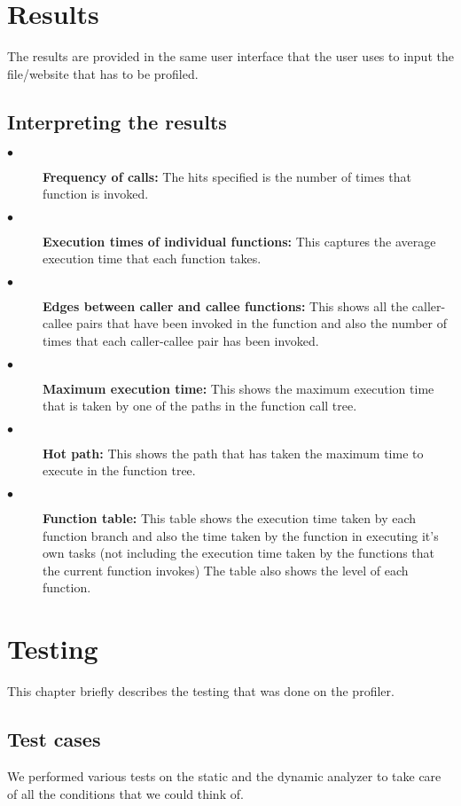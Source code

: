 \documentclass[a4paper, 12pt, notitlepage]{report}
\begin{document}
\chapter{Results}
%
The results are provided in the same user interface that the user uses to input the file/website that has to be profiled.

\section{Interpreting the results}
%
\begin{description}
\item[$\bullet$] \textbf{Frequency of calls:} The hits specified is the number of times that function is invoked.
\item[$\bullet$] \textbf{Execution times of individual functions:} This captures the average execution time that each function takes.
\item[$\bullet$] \textbf{Edges between caller and callee functions:} This shows all the caller-callee pairs that have been invoked in the function and also the number of times that each caller-callee pair has been invoked.
\item[$\bullet$] \textbf{Maximum execution time:} This shows the maximum execution time that is taken by one of the paths in the function call tree.
\item[$\bullet$] \textbf{Hot path:} This shows the path that has taken the maximum time to execute in the function tree.
\item[$\bullet$] \textbf{Function table:} This table shows the execution time taken by each function branch and also the time taken by the function in executing it's own tasks (not including the execution time taken by the functions that the current function invokes) The table also shows the level of each function.


\end{description}

\chapter{Testing}
%
This chapter briefly describes the testing that was done on the profiler.

\section{Test cases}
We performed various tests on the static and the dynamic analyzer to take care of all the conditions that we could think of.
\end{document}
